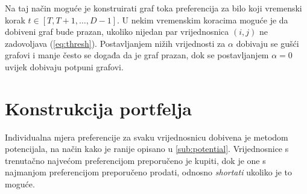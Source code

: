 \documentclass[lmodern, utf8, diplomski, numeric]{fer}
\newcommand{\q}{\left}
\newcommand{\w}{\right}
\begin{document}
  Na taj način moguće je konstruirati graf toka preferencija za bilo koji vremenski korak $t \in \q[T, T + 1, \ldots, D-1\w]$.
  U nekim vremenskim koracima moguće je da dobiveni graf bude prazan, ukoliko nijedan par vrijednosnica $(i,j)$ ne zadovoljava (\ref{eq:thresh}).
  Postavljanjem nižih vrijednosti za $\alpha$ dobivaju se gušći grafovi i manje često se događa da je graf prazan, dok se postavljanjem $\alpha = 0$ uvijek dobivaju potpuni grafovi.
  
  \section{Konstrukcija portfelja}
  Individualna mjera preferencije za svaku vrijednosnicu dobivena je metodom potencijala, na način kako je ranije opisano u \ref{sub:potential}.
  Vrijednosnice s trenutačno najvećom preferencijom preporučeno je kupiti, dok je one s najmanjom preferencijom preporučeno prodati, odnosno \textit{shortati} ukoliko je to moguće.
  
\end{document}
